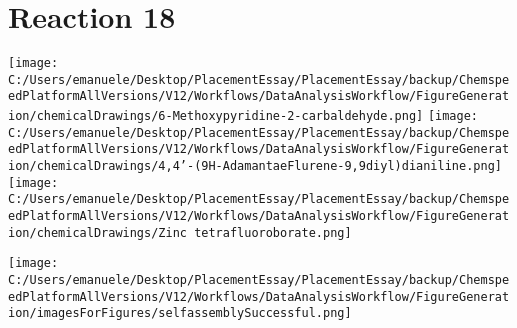 \documentclass{article}%
\begin{document}
\section*{Reaction 18}%
%
\begin{scheme}[H]%
\begin{minipage}{0.5\textwidth}%
\texttt{[image: C:/Users/emanuele/Desktop/PlacementEssay/PlacementEssay/backup/ChemspeedPlatformAllVersions/V12/Workflows/DataAnalysisWorkflow/FigureGeneration/chemicalDrawings/6-Methoxypyridine-2-carbaldehyde.png]}%
\texttt{[image: C:/Users/emanuele/Desktop/PlacementEssay/PlacementEssay/backup/ChemspeedPlatformAllVersions/V12/Workflows/DataAnalysisWorkflow/FigureGeneration/chemicalDrawings/4,4'-(9H-AdamantaeFlurene-9,9diyl)dianiline.png]}%
\texttt{[image: C:/Users/emanuele/Desktop/PlacementEssay/PlacementEssay/backup/ChemspeedPlatformAllVersions/V12/Workflows/DataAnalysisWorkflow/FigureGeneration/chemicalDrawings/Zinc tetrafluoroborate.png]}%
\end{minipage}%
\begin{minipage}{0.5\textwidth}%
\begin{center}%
\texttt{[image: C:/Users/emanuele/Desktop/PlacementEssay/PlacementEssay/backup/ChemspeedPlatformAllVersions/V12/Workflows/DataAnalysisWorkflow/FigureGeneration/imagesForFigures/selfassemblySuccessful.png]}%
\end{center}%
\end{minipage}%
\caption{Self-assembly of components 6, 13, with Zinc(II) in a 3.0:1.5:1.0 molar ratio in CH$_3$CN at 60\textdegree C for 40h. These are the reagents (starting materials) for reaction 18.}%
\end{scheme}%
\end{document}
